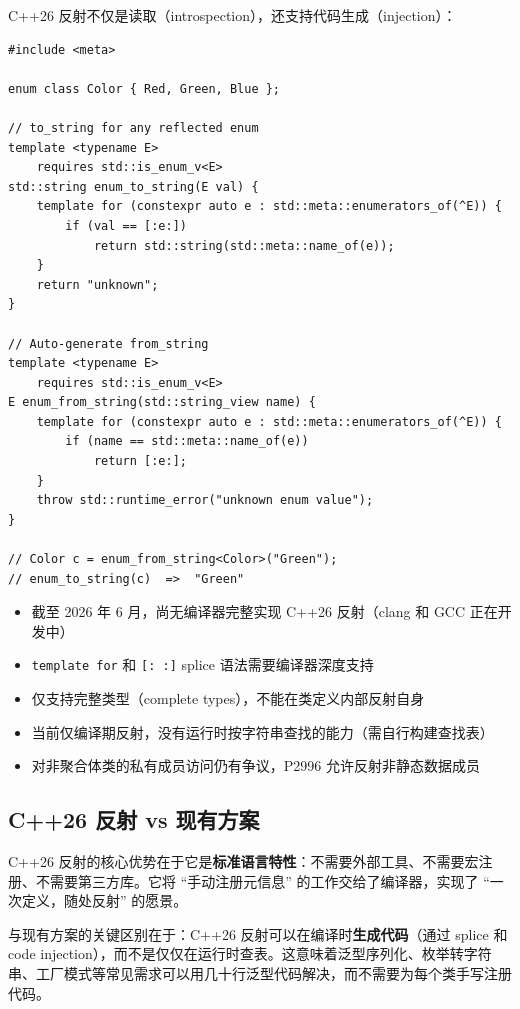 \documentclass[12pt,a4paper,fontset=fandol]{ctexbook}
\begin{document}
C++26 反射不仅是读取（introspection），还支持代码生成（injection）：

\begin{lstlisting}[language=Cpp26,caption={C++26 反射: 枚举反射与代码注入}]
#include <meta>

enum class Color { Red, Green, Blue };

// to_string for any reflected enum
template <typename E>
    requires std::is_enum_v<E>
std::string enum_to_string(E val) {
    template for (constexpr auto e : std::meta::enumerators_of(^E)) {
        if (val == [:e:])
            return std::string(std::meta::name_of(e));
    }
    return "unknown";
}

// Auto-generate from_string
template <typename E>
    requires std::is_enum_v<E>
E enum_from_string(std::string_view name) {
    template for (constexpr auto e : std::meta::enumerators_of(^E)) {
        if (name == std::meta::name_of(e))
            return [:e:];
    }
    throw std::runtime_error("unknown enum value");
}

// Color c = enum_from_string<Color>("Green");
// enum_to_string(c)  =>  "Green"
\end{lstlisting}

\begin{warning}[title={C++26 反射的局限与注意事项}]
\begin{itemize}[nosep]
  \item 截至 2026 年 6 月，尚无编译器完整实现 C++26 反射（clang 和 GCC 正在开发中）
  \item \texttt{template for} 和 \texttt{[: :]} splice 语法需要编译器深度支持
  \item 仅支持完整类型（complete types），不能在类定义内部反射自身
  \item 当前仅编译期反射，没有运行时按字符串查找的能力（需自行构建查找表）
  \item 对非聚合体类的私有成员访问仍有争议，P2996 允许反射非静态数据成员
\end{itemize}
\end{warning}

\subsection{C++26 反射 vs 现有方案}

C++26 反射的核心优势在于它是\textbf{标准语言特性}：不需要外部工具、不需要宏注册、不需要第三方库。它将 ``手动注册元信息'' 的工作交给了编译器，实现了 ``一次定义，随处反射'' 的愿景。

与现有方案的关键区别在于：C++26 反射可以在编译时\textbf{生成代码}（通过 splice 和 code injection），而不是仅仅在运行时查表。这意味着泛型序列化、枚举转字符串、工厂模式等常见需求可以用几十行泛型代码解决，而不需要为每个类手写注册代码。
\end{document}
